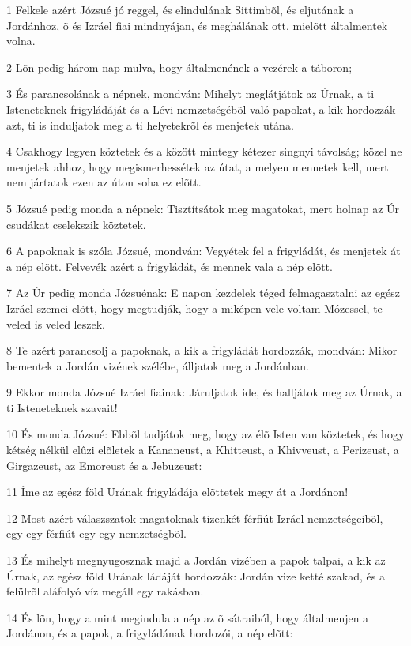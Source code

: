 \par 1 Felkele azért Józsué jó reggel, és elindulának Sittimbõl, és eljutának a Jordánhoz, õ és Izráel fiai mindnyájan, és meghálának ott, mielõtt általmentek volna.
\par 2 Lõn pedig három nap mulva, hogy általmenének a vezérek a táboron;
\par 3 És parancsolának a népnek, mondván: Mihelyt meglátjátok az Úrnak, a ti Isteneteknek frigyládáját és a Lévi nemzetségébõl való papokat, a kik hordozzák azt, ti is induljatok meg a ti helyetekrõl és menjetek utána.
\par 4 Csakhogy legyen köztetek és a között mintegy kétezer singnyi távolság; közel ne menjetek ahhoz, hogy megismerhessétek az útat, a melyen mennetek kell, mert nem jártatok ezen az úton soha ez elõtt.
\par 5 Józsué pedig monda a népnek: Tisztítsátok meg magatokat, mert holnap az Úr csudákat cselekszik köztetek.
\par 6 A papoknak is szóla Józsué, mondván: Vegyétek fel a frigyládát, és menjetek át a nép elõtt. Felvevék azért a frigyládát, és mennek vala a nép elõtt.
\par 7 Az Úr pedig monda Józsuénak: E napon kezdelek téged felmagasztalni az egész Izráel szemei elõtt, hogy megtudják, hogy a miképen vele voltam Mózessel,  te veled is veled leszek.
\par 8 Te azért parancsolj a papoknak, a kik a frigyládát hordozzák, mondván: Mikor bementek a Jordán vizének szélébe, álljatok meg a Jordánban.
\par 9 Ekkor monda Józsué Izráel fiainak: Járuljatok ide, és halljátok meg az Úrnak, a ti Isteneteknek szavait!
\par 10 És monda Józsué: Ebbõl tudjátok meg, hogy az élõ Isten van köztetek, és hogy kétség nélkül elûzi elõletek a Kananeust, a Khitteust, a Khivveust, a Perizeust, a Girgazeust, az Emoreust és a  Jebuzeust:
\par 11 Íme az egész föld Urának frigyládája elõttetek megy át a Jordánon!
\par 12 Most azért válaszszatok magatoknak tizenkét férfiút Izráel nemzetségeibõl, egy-egy férfiút egy-egy nemzetségbõl.
\par 13 És mihelyt megnyugosznak majd a Jordán vizében a papok talpai, a kik az Úrnak, az egész föld Urának ládáját hordozzák: Jordán vize ketté szakad,  és a felülrõl aláfolyó víz megáll egy rakásban.
\par 14 És lõn, hogy a mint megindula a nép az õ sátraiból, hogy általmenjen a Jordánon, és a papok, a frigyládának hordozói, a nép elõtt:
